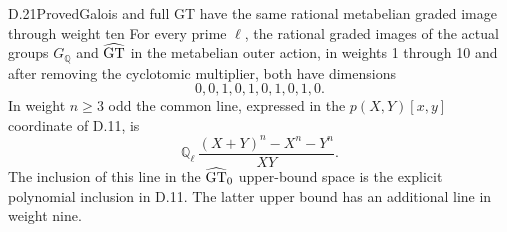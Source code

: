 \begin{statement}{D.21}{Proved}{Galois and full GT have the same rational metabelian graded image through weight ten}
For every prime $\ell$, the rational graded images of the actual groups $G_{\mathbb Q}$ and $\widehat{\rm GT}$ in the metabelian outer action, in weights 1 through 10 and after removing the cyclotomic multiplier, both have dimensions
\[
                 0,0,1,0,1,0,1,0,1,0.                     \tag{D.21}
\]
In weight $n\geq3$ odd the common line, expressed in the $p(X,Y)[x,y]$ coordinate of D.11, is
\[
 \mathbb Q_\ell\,
 \frac{(X+Y)^n-X^n-Y^n}{XY}.                                \tag{D.22}
\]
The inclusion of this line in the $\widehat{\rm GT}_0$ upper-bound space is the explicit polynomial inclusion in D.11. The latter upper bound has an additional line in weight nine.
\end{statement}

